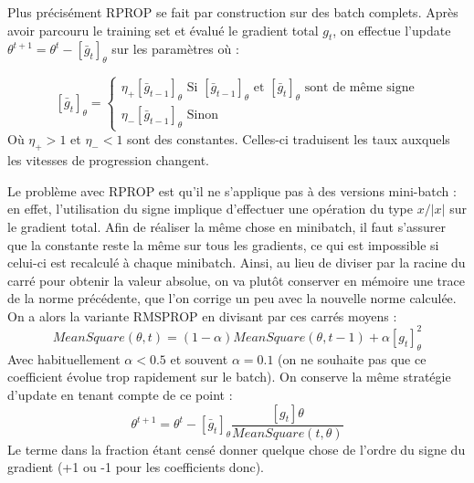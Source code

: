 \documentclass[conference]{IEEEtran}
\begin{document}
Plus précisément RPROP se fait par construction sur des batch complets. Après avoir parcouru le training set et évalué le gradient total $g_t$, on effectue l'update $\theta^{t+1}=\theta^t-[\bar{g}_t]_\theta$ sur les paramètres où :

$$
[\bar{g}_t]_\theta=\left\{
\begin{array}{l}
\eta_+[\bar{g}_{t-1}]_\theta \mbox{ Si $[\bar{g}_{t-1}]_\theta$ et $[\bar{g}_{t}]_\theta$ sont de même signe} \\
\eta_-[\bar{g}_{t-1}]_\theta \mbox{ Sinon} 
\end{array}
\right.
$$
Où $\eta_+>1$ et $\eta_-<1$ sont des constantes. Celles-ci traduisent les taux auxquels les vitesses de progression changent.

Le problème avec RPROP est qu'il ne s'applique pas à des versions mini-batch : en effet, l'utilisation du signe implique d'effectuer une opération du type $x/|x|$ sur le gradient total. Afin de réaliser la même chose en minibatch, il faut s'assurer que la constante reste la même sur tous les gradients, ce qui est impossible si celui-ci est recalculé à chaque minibatch. Ainsi, au lieu de diviser par la racine du carré pour obtenir la valeur absolue, on va plutôt conserver en mémoire une trace de la norme précédente, que l'on corrige un peu avec la nouvelle norme calculée. On a alors la variante RMSPROP en divisant par ces carrés moyens :
$$MeanSquare(\theta,t)=(1-\alpha)MeanSquare(\theta,t-1)+\alpha [g_t]_\theta^2$$
Avec habituellement $\alpha<0.5$ et souvent $\alpha=0.1$ (on ne souhaite pas que ce coefficient évolue trop rapidement sur le batch). On conserve la même stratégie d'update en tenant compte de ce point :
$$\theta^{t+1}=\theta^t-[\bar{g}_t]_\theta\frac{[g_t]\theta}{MeanSquare(t,\theta)}$$
Le terme dans la fraction étant censé donner quelque chose de l'ordre du signe du gradient (+1 ou -1 pour les coefficients donc).


%
%
\end{document}
